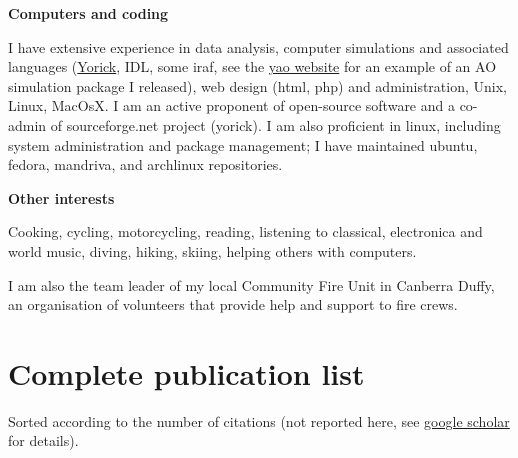 \documentclass[]{friggeri-cv}
\begin{document}
{\bf Computers and coding}

I have extensive experience in data analysis, computer simulations and associated languages (\href{http://www.maumae.net/yorick}{Yorick}, IDL, some iraf, see the \href{http://www.maumae.net/yao}{yao website} for an example of an AO simulation package I released), web design (html, php) and administration, Unix, Linux, MacOsX. I am an active proponent of open-source software and a co-admin of sourceforge.net project (yorick). I am also proficient in linux, including system administration and package management; I have maintained ubuntu, fedora, mandriva, and archlinux repositories.

{\bf Other interests}

Cooking, cycling, motorcycling, reading, listening to classical, electronica and world music, diving, hiking, skiing, helping others with computers.

I am also the team leader of my local Community Fire Unit in Canberra Duffy, an organisation of volunteers that provide help and support to fire crews.


\newpage
\section{Complete publication list}


Sorted according to the number of citations
(not reported here, see \href{http://scholar.google.com/citations?hl=en\&user=SD\_leV4AAAAJ}
{google scholar} for details). %



\begin{refsection}
  \nocite{*}
  \newrefcontext[sorting=none]
  \printbibliography[type=article, title={Refereed journals}, heading=subbibliography]
\end{refsection}

\begin{refsection}
  \nocite{*}
  \newrefcontext[sorting=none]
  \printbibliography[type=inproceedings, title={Conference proceedings}, heading=subbibliography]
\end{refsection}

\end{document}
